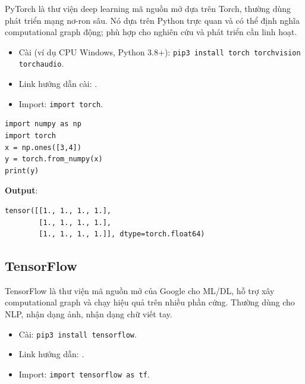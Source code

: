 \begin{dinhnghia}[title={PyTorch}]
PyTorch là thư viện deep learning mã nguồn mở dựa trên Torch, thường dùng phát triển mạng nơ-ron sâu.
Nó dựa trên Python trực quan và có thể định nghĩa computational graph động; phù hợp cho nghiên cứu và phát triển cần linh hoạt.
\end{dinhnghia}

\begin{phuongphap}[title={Cài đặt/nhập}]
\begin{itemize}
  \item Cài (ví dụ CPU Windows, Python 3.8+): \texttt{pip3 install torch torchvision torchaudio}.
  \item Link hướng dẫn cài: .
  \item Import: \texttt{import torch}.
\end{itemize}
\end{phuongphap}

\begin{vidu}[title={Ví dụ: NumPy array $\rightarrow$ torch tensor}]
\begin{lstlisting}
import numpy as np
import torch
x = np.ones([3,4])
y = torch.from_numpy(x)
print(y)
\end{lstlisting}

\textbf{Output}:
\begin{lstlisting}
tensor([[1., 1., 1., 1.],
        [1., 1., 1., 1.],
        [1., 1., 1., 1.]], dtype=torch.float64)
\end{lstlisting}
\end{vidu}

\subsection{TensorFlow}

\begin{dinhnghia}[title={TensorFlow}]
TensorFlow là thư viện mã nguồn mở của Google cho ML/DL, hỗ trợ xây computational graph và chạy hiệu quả trên nhiều phần cứng.
Thường dùng cho NLP, nhận dạng ảnh, nhận dạng chữ viết tay.
\end{dinhnghia}

\begin{phuongphap}[title={Cài đặt/nhập}]
\begin{itemize}
  \item Cài: \texttt{pip3 install tensorflow}.
  \item Link hướng dẫn: .
  \item Import: \texttt{import tensorflow as tf}.
\end{itemize}
\end{phuongphap}

